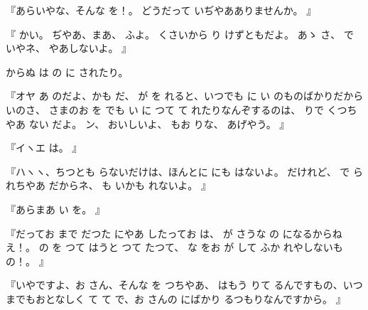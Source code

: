 『あらいやな、そんな
を！。
どうだって
いぢやあありませんか。
』

『
かい。
ぢやあ、まあ、
ふよ。
くさいから
り
けずともだよ。
あゝ
さ、
で
いやネ、
やあしないよ。
』

からぬ
は
の
に
されたり。

『オヤ
あ
のだよ、かも
だ、
が
を
れると、いつでも
に
い
のものばかりだから
いのさ、
さまのお
を
でも
い
に
つて
て
れたりなんぞするのは、
りで
くつちやあ
ない
だよ。
ン、
おいしいよ、
もお
りな、
あげやう。
』

『イヽエ
は。
』

『ハヽヽ、ちつとも
らないだけは、ほんとに
にも
はないよ。
だけれど、
で
られちやあ
だからネ、
も
いかも
れないよ。
』

『あらまあ
い
を。
』

『だってお
まで
だつた
にやあ
したってお
は、
が
さうな
の
になるからねえ！。
の
を
つて
はうと
つて
たつて、
な
をお
が
して
ふか
れやしないもの！。
』

『いやですよ、お
さん、そんな
を
つちやあ、
はもう
りて
るんですもの、いつまでもおとなしく
て
て
で、お
さんの
にばかり
るつもりなんですから。
』

